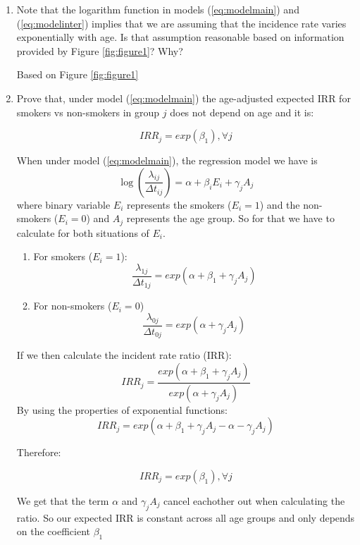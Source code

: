 \documentclass[10pt,a4paper,twoside]{article}\usepackage[]{graphicx}\usepackage[]{xcolor}
\begin{document}
\begin{enumerate}
    \item  Note that the logarithm function in models (\ref{eq:modelmain}) and (\ref{eq:modelinter}) implies that we are assuming that the incidence rate varies exponentially with age. Is that assumption reasonable based on information provided by Figure \ref{fig:figure1}? Why?

    Based on Figure \ref{fig:figure1} 

    \item Prove that, under model (\ref{eq:modelmain}) the age-adjusted expected IRR for smokers vs non-smokers in group $j$ does not depend on age and it is:

    \begin{equation}
    \label{eq:betadependent}
        IRR_{j} = exp(\beta_{1}),  \forall j
    \end{equation}
    
    
    When under model (\ref{eq:modelmain}), the regression model we have is
    \[
    \log \left(\frac{\lambda_{ij}}{\Delta t_{ij}} \right) = \alpha + \beta_{i} E_{i} + \gamma_{j} A_{j}
    \]
    where binary variable $E_{i}$ represents the smokers ($E_{i} = 1$) and the non-smokers ($E_{i}=0$) and $A_{j}$ represents the age group. So for that we have to calculate for both situations of $E_{i}$.
    \begin{enumerate}
        \item For smokers ($E_{i} = 1$):
    \[
        \frac{\lambda_{1j}}{\Delta t_{1j}} = exp \left( \alpha + \beta_{1} + \gamma_{j} A_{j} \right)
    \]
        \item For non-smokers ($E_{i} = 0$)
        \[
        \frac{\lambda_{0j}}{\Delta t_{0j}} = exp \left( \alpha + \gamma_{j} A_{j} \right)
    \]
    \end{enumerate}
If we then calculate the incident rate ratio (IRR):
\[
        IRR_{j} = \frac{exp \left( \alpha + \beta_{1} + \gamma_{j} A_{j} \right) }{exp \left(\alpha + \gamma_{j} A_{j} \right)}
    \]
By using the properties of exponential functions:
\[
    IRR_{j} = exp \left(\alpha + \beta_{1} + \gamma_{j} A_{j} - \alpha - \gamma_{j} A_{j}\right)
\]

Therefore:

\[
    IRR_{j} = exp \left(\beta_{1}\right), \forall j
\]

We get that the term $\alpha$ and $\gamma_{j} A_{j}$ cancel eachother out when calculating the ratio. So our expected IRR is constant across all age groups and only depends on the coefficient $\beta_{1}$


\end{enumerate}
\end{document}
